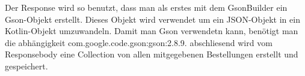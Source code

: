 Der Response wird so benutzt, dass man als erstes mit dem GsonBuilder ein Gson-Objekt erstellt.
Dieses Objekt wird verwendet um ein JSON-Objekt in ein Kotlin-Objekt umzuwandeln. 
Damit man Gson verwendetn kann, benötigt man die abhängigkeit com.google.code.gson:gson:2.8.9.
abschliesend wird vom Responsebody eine Collection von allen mitgegebenen Bestellungen erstellt und gespeichert.


